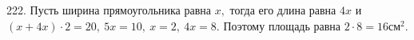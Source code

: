 222. Пусть ширина прямоугольника равна $x,$ тогда его длина равна $4x$ и $(x+4x)\cdot2=20,\ 5x=10,\ x=2,\ 4x=8.$ Поэтому площадь равна $2\cdot8=16\text{см}^2.$\\
